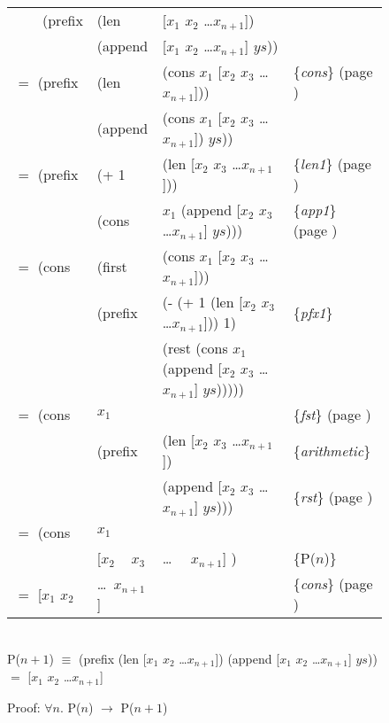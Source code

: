 \begin{figure}
\begin{center}
\setlength{\tabcolsep}{1pt}
\begin{tabular}{llll}
~~~~(prefix &(len    &[$x_1$ $x_2$ \dots $x_{n+1}$])             &\\
            &(append &[$x_1$ $x_2$ \dots $x_{n+1}$] $ys$))       &\\
$=$ (prefix &(len    &(cons $x_1$ [$x_2$ $x_3$ \dots $x_{n+1}$]))&\{\emph{cons}\} (page \pageref{first-rest-cons})\\
            &(append &(cons $x_1$ [$x_2$ $x_3$ \dots $x_{n+1}$]) $ys$))&\\
$=$	(prefix &(+ 1    &(len [$x_2$ $x_3$ \dots $x_{n+1}$]))       &\{\emph{len1}\} (page \pageref{len-equations})\\
            &(cons   &$x_1$ (append [$x_2$ $x_3$ \dots $x_{n+1}$] $ys$)))&\{\emph{app1}\} (page \pageref{append-equations})\\
$=$ (cons   &(first  &(cons $x_1$ [$x_2$ $x_3$ \dots $x_{n+1}$]))&\\
            &(prefix &(- (+ 1 (len [$x_2$ $x_3$ \dots $x_{n+1}$])) 1)&\{\emph{pfx1}\}\\
            &        &(rest (cons $x_1$ (append [$x_2$ $x_3$ \dots $x_{n+1}$] $ys$)))))&\\
$=$ (cons   &$x_1$   &                                           &\{\emph{fst}\} (page \pageref{first-rest-cons})\\
            &(prefix &(len [$x_2$ $x_3$ \dots $x_{n+1}$])        &\{\emph{arithmetic}\}\\
            &        &(append [$x_2$ $x_3$ \dots $x_{n+1}$] $ys$)))& \{\emph{rst}\} (page \pageref{first-rest-cons})\\
$=$ (cons   &$x_1$   &                                           &\\
            &[$x_2$ ~ $x_3$ &\dots ~~ $x_{n+1}$] )               &\{P($n$)\} \\
$=$ [$x_1$ $x_2$ & \dots~$x_{n+1}$]                             &&\{\emph{cons}\} (page \pageref{first-rest-cons}) \\
\end{tabular}
~~\\
\vspace{2mm}
P($n+1$) $\equiv$ (prefix (len [$x_1$ $x_2$ \dots $x_{n+1}$]) (append [$x_1$ $x_2$ \dots $x_{n+1}$] $ys$)) $=$ [$x_1$ $x_2$ \dots $x_{n+1}$]
\end{center}
\caption{Proof: $\forall n.$ P($n$) $\rightarrow$ P($n+1$)}
\label{pfx-induc}
\end{figure}

